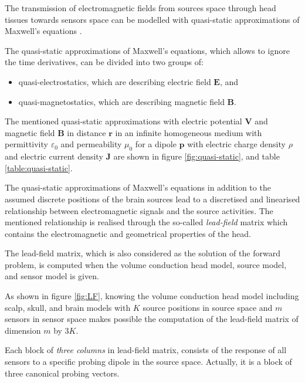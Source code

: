 The transmission of electromagnetic fields from sources space through head tissues towards sensors space can be modelled with quasi-static approximations of Maxwell’s equations \cite{Sarvas1987}.

The quasi-static approximations of Maxwell’s equations, which allows to ignore the time derivatives, can be divided into two groups of: 
\begin{itemize}
\item quasi-electrostatics, which are describing electric field $\boldsymbol{E}$, and
\item quasi-magnetostatics, which are describing magnetic field $\boldsymbol{B}$.
\end{itemize} 

The mentioned quasi-static approximations with electric potential $\boldsymbol{V}$ and magnetic field $\boldsymbol{B}$ in distance $\boldsymbol{r}$ in an infinite homogeneous medium with permittivity $\varepsilon_0$ and permeability $\mu_0$ for a dipole $\boldsymbol{p}$ with electric charge density $\rho$ and electric current density $\boldsymbol{J}$ are shown in figure \ref{fig:quasi-static}, and table \ref{table:quasi-static}.

The quasi-static approximations of Maxwell’s equations in addition to the assumed discrete positions of the brain sources lead to a discretised and linearised relationship between electromagnetic signals and the source activities.
The mentioned relationship is realised through the so-called \emph{lead-field} matrix which contains the electromagnetic and geometrical properties of the head.
\\


\newpage

The lead-field matrix, which is also considered as the solution of the forward problem, is computed when the volume conduction head model, source model, and sensor model is given.

As shown in figure \ref{fig:LF}, knowing the volume conduction head model including scalp, skull, and brain models with $K$ source positions in source space and $m$ sensors in sensor space makes possible the computation of the lead-field matrix of dimension $m$ by $3K$.

Each block of \emph{three columns} in lead-field matrix, consists of the response of all sensors to a specific probing dipole in the source space.
Actually, it is a block of three canonical probing vectors.

\FloatBarrier